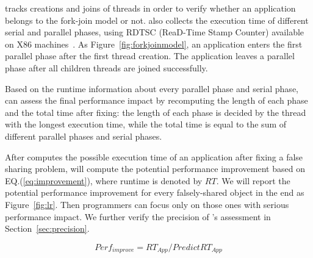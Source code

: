 \cheetah{} tracks creations and joins of threads in order to verify whether an application belongs to the fork-join model or not. \Cheetah{} also collects the execution time of different serial and parallel phases,  using RDTSC (ReaD-Time Stamp Counter) available on X86 machines~\cite{rtdsc}.  As Figure~\ref{fig:forkjoinmodel}, an application enters the first parallel phase after the first thread creation. The application leaves a parallel phase after all children threads are joined successfully. 

Based on the runtime information about every parallel phase and serial phase, \cheetah{} can assess the final performance impact by recomputing the length of each phase and the total time after fixing: the length of each phase is decided by the thread with the longest execution time, while the total time is equal to the sum of different parallel phases and serial phases. 

After \cheetah{} computes the possible execution time of an application after fixing a false sharing problem, \cheetah{} will compute the potential performance improvement based on EQ.(\ref{eq:improvement}), where runtime is denoted by $RT$. We will report the potential performance improvement for every falsely-shared object in the end as Figure~\ref{fig:lr}. Then programmers can focus only on those ones with serious performance impact. We further verify the precision of \cheetah{}'s assessment in Section~\ref{sec:precision}.

\begin{equation}
\label{eq:improvement}
Perf_{improve}= RT_{App} / PredictRT_{App}
\end{equation}










